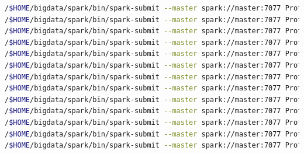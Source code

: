 \begin{lstlisting}[label=sprofdis,language=sh,frame=single,caption=Script onas que más beneficios proporcionarían al taxista sin estacionalidad en modo distribuido]
/$HOME/bigdata/spark/bin/spark-submit --master spark://master:7077 ProfitableAreas.py mil.parquet 2013-01-01 09:45
/$HOME/bigdata/spark/bin/spark-submit --master spark://master:7077 ProfitableAreas.py quinientos.parquet 2013-01-01 09:45
/$HOME/bigdata/spark/bin/spark-submit --master spark://master:7077 ProfitableAreas.py cinquenta.parquet 2013-01-01 09:45
/$HOME/bigdata/spark/bin/spark-submit --master spark://master:7077 ProfitableAreas.py 1decimo.parquet 2013-01-01 09:45
/$HOME/bigdata/spark/bin/spark-submit --master spark://master:7077 ProfitableAreas.py 2decimo.parquet 2013-01-01 09:45
/$HOME/bigdata/spark/bin/spark-submit --master spark://master:7077 ProfitableAreas.py 3decimo.parquet 2013-01-01 09:45
/$HOME/bigdata/spark/bin/spark-submit --master spark://master:7077 ProfitableAreas.py 4decimo.parquet 2013-01-01 09:45
/$HOME/bigdata/spark/bin/spark-submit --master spark://master:7077 ProfitableAreas.py half.parquet 2013-01-01 09:45
/$HOME/bigdata/spark/bin/spark-submit --master spark://master:7077 ProfitableAreas.py 6decimo.parquet 2013-01-01 09:45
/$HOME/bigdata/spark/bin/spark-submit --master spark://master:7077 ProfitableAreas.py 7decimo.parquet 2013-01-01 09:45
/$HOME/bigdata/spark/bin/spark-submit --master spark://master:7077 ProfitableAreas.py 8decimo.parquet 2013-01-01 09:45
/$HOME/bigdata/spark/bin/spark-submit --master spark://master:7077 ProfitableAreas.py 9decimo.parquet 2013-01-01 09:45
/$HOME/bigdata/spark/bin/spark-submit --master spark://master:7077 ProfitableAreas.py full.parquet 2013-01-01 09:45
\end{lstlisting}

